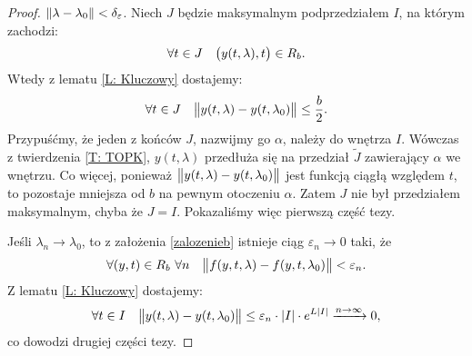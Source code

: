 \begin{proof}
  $\norm{\lambda - \lambda_0} < \delta_{\varepsilon}$.
  Niech $J$ będzie maksymalnym podprzedziałem $I$, na którym zachodzi:
%
  \begin{equation*}
    \forall t \in J \quad \p[\big]{ y(t,\lambda), t } \in R_b.
  \end{equation*}
%
  Wtedy z lematu \ref{L: Kluczowy} dostajemy:
%
  \begin{equation*}
    \forall t \in J \quad \norm[\big]{ y(t,\lambda) - y(t,\lambda_0) } \leq \frac b2.
  \end{equation*}
%
  Przypuśćmy, że jeden z końców $J$, nazwijmy go $\alpha$, należy do wnętrza $I$. Wówczas z twierdzenia \ref{T: TOPK}, 
  $y(t,\lambda)$ przedłuża się na przedział $\widetilde{J}$ zawierający $\alpha$ we wnętrzu. Co więcej, ponieważ 
  $\norm[\big]{ y(t,\lambda) - y(t,\lambda_0) }$ jest funkcją ciągłą względem $t$, to pozostaje mniejsza od $b$ na 
  pewnym otoczeniu $\alpha$. Zatem $J$ nie był przedziałem maksymalnym, chyba że $J = I$. Pokazaliśmy więc pierwszą 
  część tezy.
  
  Jeśli $\lambda_n \to \lambda_0$, to z założenia \ref{zalozenieb} istnieje ciąg $\varepsilon_n \to 0$ taki, że
%
  \begin{equation*}
    \forall (y,t) \in R_b \ \forall n \quad \norm[\big]{ f(y,t,\lambda) - f(y,t,\lambda_0) } < \varepsilon_n.
  \end{equation*}
%
  Z lematu \ref{L: Kluczowy} dostajemy:
%
  \begin{equation*}
    \forall t \in I \quad \norm[\big]{ y(t,\lambda) - y(t,\lambda_0) } \leq
    \varepsilon_n \cdot \abs{I} \cdot e^{L \abs{I}} \xrightarrow{n\to\infty} 0,
  \end{equation*}
%
  co dowodzi drugiej części tezy.
\end{proof}


































